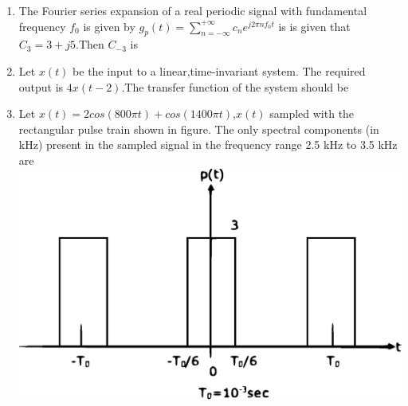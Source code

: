 \documentclass[journal,12pt,twocolumn]{IEEEtran}
\begin{document}
\begin{enumerate}[1.]
\begin{enumerate}[(A)]
\end{enumerate}

\item The Fourier series expansion of a real periodic signal with fundamental frequency $f_0$ is given by $g_p(t)=\sum\limits_{n=-\infty}^{+\infty} c_n e^{j2\pi n f_0 t}$ is is given that $C_3=3+j5$.Then $C_{-3}$ is
\begin{enumerate}[(A)]
\end{enumerate}

\item Let $x(t)$ be the input to a linear,time-invariant system. The required output is $4x(t-2)$.The transfer function of the system should be
\begin{enumerate}[(A)]
\end{enumerate}


\item Let $x(t)=2cos(800\pi t)+cos(1400\pi t)$,$x(t)$ sampled with the rectangular pulse train shown in figure. The only spectral components (in kHz) present in the sampled signal in the frequency range 2.5 kHz to 3.5 kHz are \\

\includegraphics[scale=0.4]{fig2.eps}\\


\end{enumerate}
\end{document}
